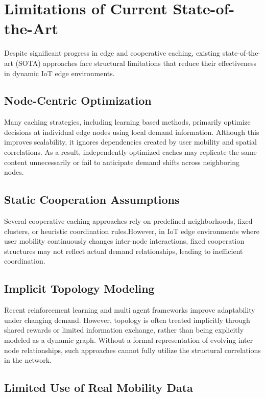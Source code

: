 \section{Limitations of Current State-of-the-Art}

Despite significant progress in edge and cooperative caching, existing state-of-the-art (SOTA) approaches face structural limitations that reduce their effectiveness in dynamic IoT edge environments.

\subsection{Node-Centric Optimization}

Many caching strategies, including learning based methods, primarily optimize decisions at individual edge nodes using local demand information. Although this improves scalability, it ignores dependencies created by user mobility and spatial correlations. As a result, independently optimized caches may replicate the same content unnecessarily or fail to anticipate demand shifts across neighboring nodes.

\subsection{Static Cooperation Assumptions}

Several cooperative caching approaches rely on predefined neighborhoods, fixed clusters, or heuristic coordination rules.However, in IoT edge environments where user mobility continuously changes inter-node interactions, fixed cooperation structures may not reflect actual demand relationships, leading to inefficient coordination.

\subsection{Implicit Topology Modeling}

Recent reinforcement learning and multi agent frameworks improve adaptability under changing demand. However, topology is often treated implicitly through shared rewards or limited information exchange, rather than being explicitly modeled as a dynamic graph. Without a formal representation of evolving inter node relationships, such approaches cannot fully utilize the structural correlations in the network.

\subsection{Limited Use of Real Mobility Data}

